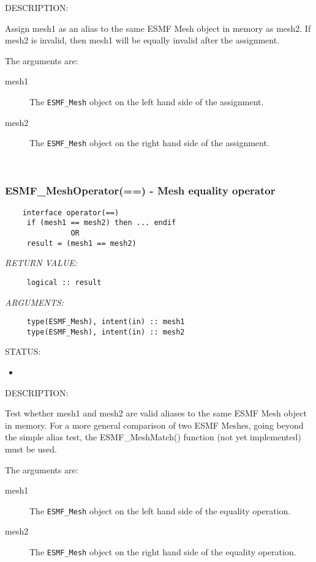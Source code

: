 {\sf DESCRIPTION:\\ }


     Assign mesh1 as an alias to the same ESMF Mesh object in memory
     as mesh2. If mesh2 is invalid, then mesh1 will be equally invalid after
     the assignment.
  
     The arguments are:
     \begin{description}
     \item[mesh1]
       The {\tt ESMF\_Mesh} object on the left hand side of the assignment.
     \item[mesh2]
       The {\tt ESMF\_Mesh} object on the right hand side of the assignment.
     \end{description}
   
 
\mbox{}\hrulefill\ 
 
\subsubsection [ESMF\_MeshOperator(==)] {ESMF\_MeshOperator(==) - Mesh equality operator}


  
\begin{verbatim}    interface operator(==)
     if (mesh1 == mesh2) then ... endif
               OR
     result = (mesh1 == mesh2)\end{verbatim}{\em RETURN VALUE:}
\begin{verbatim}     logical :: result\end{verbatim}{\em ARGUMENTS:}
\begin{verbatim}     type(ESMF_Mesh), intent(in) :: mesh1
     type(ESMF_Mesh), intent(in) :: mesh2\end{verbatim}
{\sf STATUS:}
   \begin{itemize}
   \item{}
   \end{itemize}
  
{\sf DESCRIPTION:\\ }


     Test whether mesh1 and mesh2 are valid aliases to the same ESMF
     Mesh object in memory. For a more general comparison of two ESMF Meshes,
     going beyond the simple alias test, the ESMF\_MeshMatch() function (not yet
     implemented) must be used.
  
     The arguments are:
     \begin{description}
     \item[mesh1]
       The {\tt ESMF\_Mesh} object on the left hand side of the equality
       operation.
     \item[mesh2]
       The {\tt ESMF\_Mesh} object on the right hand side of the equality
       operation.
     \end{description}
   
